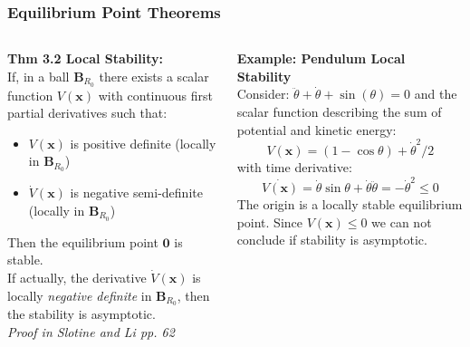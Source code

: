 \documentclass[11pt,handout]{beamer}   %
\begin{document}
\begin{frame}
\frametitle{Equilibrium Point Theorems}
\small
\begin{columns}
\begin{column}{0.5\textwidth}
\textbf{Thm 3.2 Local Stability:}\\
If, in a ball $\mathbf{B}_{R_0}$ there exists a scalar function $V(\mathbf{x})$ with continuous first partial derivatives such that:
\begin{itemize}
\item $V(\mathbf{x})$ is positive definite (locally in $\mathbf{B}_{R_0}$)
\item $\dot{V}(\mathbf{x})$ is negative semi-definite (locally in $\mathbf{B}_{R_0}$)
\end{itemize}
Then the equilibrium point $\mathbf{0}$ is stable. \\ \vspace{6pt}
If actually, the derivative $\dot{V}(\mathbf{x})$ is locally \textit{negative definite} in $\mathbf{B}_{R_0}$, then the stability is asymptotic.\\
\vspace{6pt}
\textit{Proof in Slotine and Li pp. 62}
\end{column}
\begin{column}{0.5\textwidth}
\textbf{Example: Pendulum Local Stability}\\
Consider: $\ddot{\theta} + \dot{\theta} + \sin(\theta) = 0$ and the scalar function describing the sum of potential and kinetic energy:
\begin{equation*}
V(\mathbf{x}) = (1-\cos\theta)+\dot{\theta}^2/2
\end{equation*}
with time derivative:
\begin{equation*}
\dot{V(\mathbf{x})} = \dot{\theta} \sin \theta + \dot{\theta} \ddot{\theta} = - \dot{\theta}^2 \leq 0
\end{equation*}
The origin is a locally stable equilibrium point. Since $V(\mathbf{x}) \leq 0$ we can not conclude if stability is asymptotic.
\end{column}
\end{columns}
\end{frame}
\end{document}
